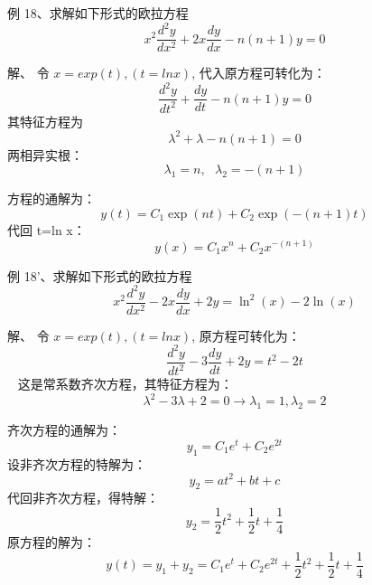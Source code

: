\begin{frame}
	\begin{exampleblock} {例 18、求解如下形式的欧拉方程}
	\begin{equation*}
		x^2 \frac{d^2 y}{d x^2} +2x \frac{d y}{d x} -n(n+1) y =0 
	\end{equation*}     
	\end{exampleblock}
	\alert{解、} 	令 $x=exp(t) , (t=ln x) $, 代入原方程可转化为：
	\begin{equation*}
		\frac{d^2 y}{d t^2}  +\frac{dy}{dt}-n(n+1) y =0 
	\end{equation*}     
	其特征方程为
	\begin{equation*}
		\lambda^2 +\lambda -n(n+1) =0	
	\end{equation*}    
	两相异实根：
	\begin{equation*}
		\lambda_1=n, ~~~\lambda_2= -(n+1)
	\end{equation*}  
\end{frame}

\begin{frame}  
	方程的通解为：
	\begin{equation*}
		y(t)=C_1 \exp (nt) +C_2 \exp (-(n+1) t)
	\end{equation*}  
	代回 t=ln x：
	\begin{equation*}
		y(x)=C_1 x^n +C_2 x^{-(n+1) }
	\end{equation*}   
\end{frame}

\begin{frame}
	\begin{exampleblock} {例 18'、求解如下形式的欧拉方程}
	\begin{equation*}
		x^2 \frac{d^2 y}{d x^2} -2x \frac{d y}{d x} +2y = \ln^2( x) -2 \ln(x) 
	\end{equation*}    
	\end{exampleblock}
	\alert{解、} 	令 $x=exp(t) , (t=ln x) $, 原方程可转化为：
	\begin{equation*}
 		\frac{d^2 y}{d t^2}  -3\frac{dy}{dt} +2 y =t^2 -2t 
 	\end{equation*}    
 	这是常系数齐次方程，其特征方程为：
 	\begin{equation*}
 		\lambda^2  -3\lambda +2  =0  \to  \lambda_1=1,   \lambda_2=2 
 	\end{equation*}   
\end{frame}


\begin{frame}
	齐次方程的通解为：
	\begin{equation*}
		y_1=C_1 e^t +C_2 e^{2t}
	\end{equation*}   
	设非齐次方程的特解为：
	\begin{equation*}
		y_2=a t^2+bt+c
	\end{equation*} 
	代回非齐次方程，得特解：
	\begin{equation*}
		y_2=\frac{1}{2} t^2+\frac{1}{2}t+\frac{1}{4}
	\end{equation*} 
	原方程的解为：
	\begin{equation*}
		y(t)=y_1+y_2=C_1 e^t +C_2 e^{2t}+\frac{1}{2} t^2+\frac{1}{2}t+\frac{1}{4}
	\end{equation*} 
\end{frame}


